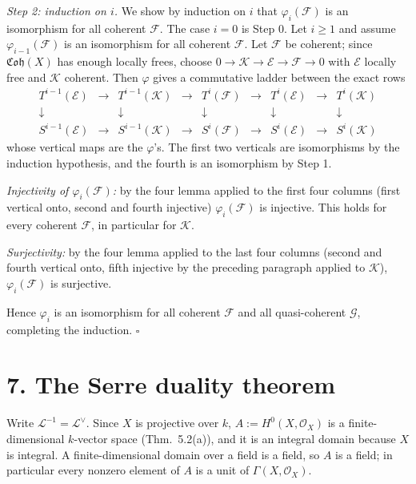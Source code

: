 \documentclass[11pt]{article}
\begin{document}
\emph{Step 2: induction on $i$.} We show by induction on $i$ that $\varphi_i(\mathcal F)$ is an isomorphism for all coherent $\mathcal F$. The case $i=0$ is Step 0. Let $i\ge1$ and assume $\varphi_{i-1}(\mathcal F)$ is an isomorphism for all coherent $\mathcal F$. Let $\mathcal F$ be coherent; since $\mathfrak{Coh}(X)$ has enough locally frees, choose $0\to\mathcal K\to\mathcal E\to\mathcal F\to0$ with $\mathcal E$ locally free and $\mathcal K$ coherent. Then $\varphi$ gives a commutative ladder between the exact rows
\[
\begin{array}{ccccccccc}
T^{i-1}(\mathcal E)&\to&T^{i-1}(\mathcal K)&\to&T^i(\mathcal F)&\to&T^i(\mathcal E)&\to&T^i(\mathcal K)\\
\downarrow&&\downarrow&&\downarrow&&\downarrow&&\downarrow\\
S^{i-1}(\mathcal E)&\to&S^{i-1}(\mathcal K)&\to&S^i(\mathcal F)&\to&S^i(\mathcal E)&\to&S^i(\mathcal K)
\end{array}
\]
whose vertical maps are the $\varphi$'s. The first two verticals are isomorphisms by the induction hypothesis, and the fourth is an isomorphism by Step 1.

\emph{Injectivity of $\varphi_i(\mathcal F)$:} by the four lemma applied to the first four columns (first vertical onto, second and fourth injective) $\varphi_i(\mathcal F)$ is injective. This holds for every coherent $\mathcal F$, in particular for $\mathcal K$.

\emph{Surjectivity:} by the four lemma applied to the last four columns (second and fourth vertical onto, fifth injective by the preceding paragraph applied to $\mathcal K$), $\varphi_i(\mathcal F)$ is surjective.

Hence $\varphi_i$ is an isomorphism for all coherent $\mathcal F$ and all quasi-coherent $\mathcal G$, completing the induction. \hfill$\square$

\section*{7. The Serre duality theorem}

\pf
Write $\mathcal L^{-1}=\mathcal L^\vee$. Since $X$ is projective over $k$, $A:=H^0(X,\mathcal O_X)$ is a finite-dimensional $k$-vector space (Thm.~5.2(a)), and it is an integral domain because $X$ is integral. A finite-dimensional domain over a field is a field, so $A$ is a field; in particular every nonzero element of $A$ is a unit of $\Gamma(X,\mathcal O_X)$.
\end{document}
